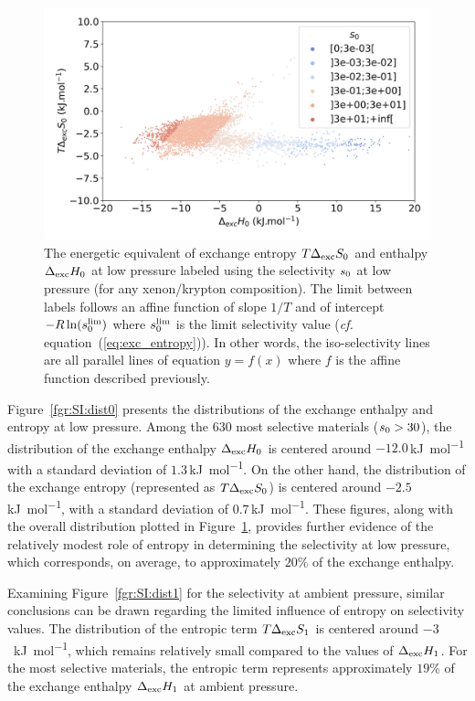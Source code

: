 \documentclass[main.tex]{subfiles}
\begin{document}
\begin{figure}[t]
\centering
  \includegraphics[width=0.6\linewidth]{figures/2-thermo/enthalpy_entropy_0_s_0.jpg}
  \caption{The energetic equivalent of exchange entropy $T\Delta_{\text{exc}}S_{\text{0}}$ and enthalpy $\Delta_{\text{exc}}H_{\text{0}}$ at low pressure labeled using the selectivity $s_{\text{0}}$ at low pressure (for any xenon/krypton composition). The limit between labels follows an affine function of slope $1/T$ and of intercept $-R\ln(s_{\text{0}}^{\text{lim}})$ where $s_{\text{0}}^{\text{lim}}$ is the limit selectivity value (\emph{cf.} equation~(\ref{eq:exc_entropy})). In other words, the iso-selectivity lines are all parallel lines of equation $y=f(x)$ where $f$ is the affine function described previously.}\label{fgr:HSplot_0}
\end{figure}


Figure~\ref{fgr:SI:dist0} presents the distributions of the exchange enthalpy and entropy at low pressure. Among the 630 most selective materials ($s_{\text{0}} > 30$), the distribution of the exchange enthalpy $\Delta_{\text{exc}}H_{\text{0}}$ is centered around $-12.0$\,\si{\kilo\joule\per\mol} with a standard deviation of $1.3$\,\si{\kilo\joule\per\mol}. On the other hand, the distribution of the exchange entropy (represented as $T\Delta_{\text{exc}}S_{\text{0}}$) is centered around $-2.5$\,\si{\kilo\joule\per\mol}, with a standard deviation of $0.7$\,\si{\kilo\joule\per\mol}. These figures, along with the overall distribution plotted in Figure~\ref{fgr:HSplot_0}, provides further evidence of the relatively modest role of entropy in determining the selectivity at low pressure, which corresponds, on average, to approximately {$20$\%} of the exchange enthalpy.

Examining Figure~\ref{fgr:SI:dist1} for the selectivity at ambient pressure, similar conclusions can be drawn regarding the limited influence of entropy on selectivity values. The distribution of the entropic term $T\Delta_{\text{exc}}S_{\text{1}}$ is centered around $-3$~\si{\kilo\joule\per\mole}, which remains relatively small compared to the values of $\Delta_{\text{exc}}H_{\text{1}}$. For the most selective materials, the entropic term represents approximately {$19$\%} of the exchange enthalpy $\Delta_{\text{exc}}H_{\text{1}}$ at ambient pressure.
\end{document}
